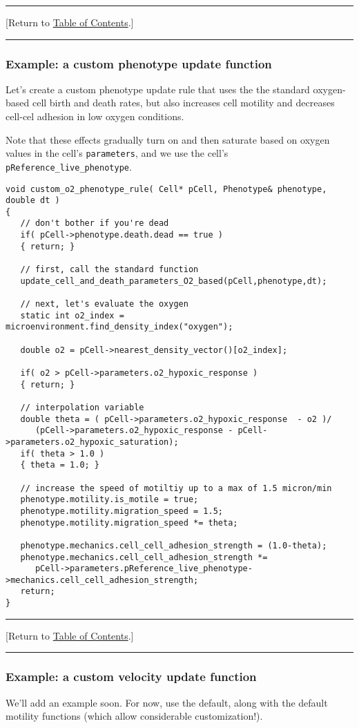 \documentclass[12pt]{article}
\renewcommand{\v}{\verb}
\newcommand{\TOClink}{\begin{center}\hrule\vskip-10pt\phantom{.}\hfill[Return to \hyperlink{TOC}{Table of Contents}.]\hfill\phantom{.}\vskip3pt\hrule\end{center}}
\begin{document}
\TOClink 

\subsubsection{Example: a custom phenotype update function}
\label{sec:Examples:phenotype_rule}
Let's create a custom phenotype update rule that uses the 
the standard oxygen-based cell birth and death rates, but 
also increases cell motility and decreases cell-cel adhesion 
in low oxygen conditions. 

Note that these effects gradually turn on and then saturate 
based on oxygen values in the cell's \v|parameters|, 
and we use the cell's \v|pReference_live_phenotype|.  
\begin{verbatim}
void custom_o2_phenotype_rule( Cell* pCell, Phenotype& phenotype, double dt )
{
   // don't bother if you're dead
   if( pCell->phenotype.death.dead == true )
   { return; }
   
   // first, call the standard function
   update_cell_and_death_parameters_O2_based(pCell,phenotype,dt);     
    
   // next, let's evaluate the oxygen 
   static int o2_index = microenvironment.find_density_index("oxygen"); 
   
   double o2 = pCell->nearest_density_vector()[o2_index];
    
   if( o2 > pCell->parameters.o2_hypoxic_response )
   { return; }
    
   // interpolation variable 
   double theta = ( pCell->parameters.o2_hypoxic_response  - o2 )/
      (pCell->parameters.o2_hypoxic_response - pCell->parameters.o2_hypoxic_saturation); 
   if( theta > 1.0 )
   { theta = 1.0; } 
    
   // increase the speed of motiltiy up to a max of 1.5 micron/min 
   phenotype.motility.is_motile = true; 
   phenotype.motility.migration_speed = 1.5; 
   phenotype.motility.migration_speed *= theta;  

   phenotype.mechanics.cell_cell_adhesion_strength = (1.0-theta);
   phenotype.mechanics.cell_cell_adhesion_strength *= 
      pCell->parameters.pReference_live_phenotype->mechanics.cell_cell_adhesion_strength;
   return; 
}
\end{verbatim}
\TOClink 

\subsubsection{Example: a custom velocity update function}
We'll add an example soon. For now, use the default, along with the 
default motility functions (which allow considerable customization!). 
\end{document}
